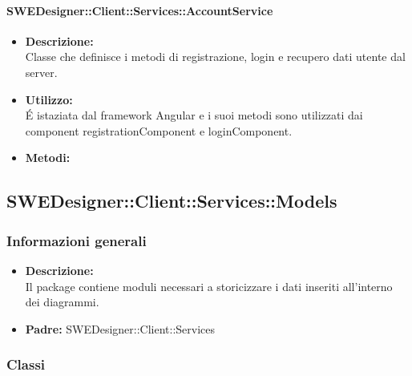           	\paragraph{SWEDesigner::Client::Services::AccountService}
				\begin{itemize}
          			\item \textbf{Descrizione:}\\
          			Classe che definisce i metodi di registrazione, login e recupero dati utente dal server.
          			\item \textbf{Utilizzo:}\\
          			É istaziata dal framework Angular e i suoi metodi sono utilizzati dai component registrationComponent e loginComponent.
          			\item \textbf{Metodi:}\\
          		\end{itemize}
	\subsection{SWEDesigner::Client::Services::Models}
		\subsubsection{Informazioni generali}
			\begin{itemize}
          		\item \textbf{Descrizione:}\\
          		Il package contiene moduli necessari a storicizzare i dati inseriti all’interno
dei diagrammi.
          		\item \textbf{Padre:} SWEDesigner::Client::Services
          	\end{itemize}
		\subsubsection{Classi}
